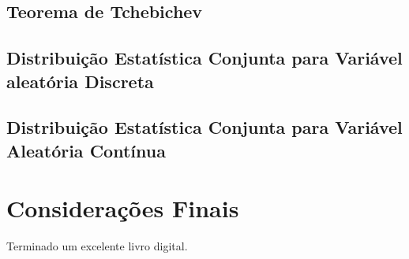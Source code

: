 \documentclass[
]{book}
\begin{document}
\hypertarget{teorema-de-tchebichev}{%
\section{Teorema de Tchebichev}\label{teorema-de-tchebichev}}

\hypertarget{distribuiuxe7uxe3o-estatuxedstica-conjunta-para-variuxe1vel-aleatuxf3ria-discreta}{%
\section{Distribuição Estatística Conjunta para Variável aleatória Discreta}\label{distribuiuxe7uxe3o-estatuxedstica-conjunta-para-variuxe1vel-aleatuxf3ria-discreta}}

\hypertarget{distribuiuxe7uxe3o-estatuxedstica-conjunta-para-variuxe1vel-aleatuxf3ria-contuxednua}{%
\section{Distribuição Estatística Conjunta para Variável Aleatória Contínua}\label{distribuiuxe7uxe3o-estatuxedstica-conjunta-para-variuxe1vel-aleatuxf3ria-contuxednua}}

\hypertarget{considerauxe7uxf5es-finais}{%
\chapter{Considerações Finais}\label{considerauxe7uxf5es-finais}}

Terminado um excelente livro digital.

  
\end{document}
